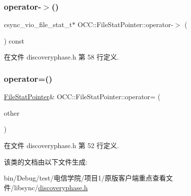 \subsubsection{\texorpdfstring{operator-\/$>$()}{operator->()}}
{\footnotesize\ttfamily csync\+\_\+vio\+\_\+file\+\_\+stat\+\_\+t$\ast$ O\+C\+C\+::\+File\+Stat\+Pointer\+::operator-\/$>$ (\begin{DoxyParamCaption}{ }\end{DoxyParamCaption}) const}



在文件 discoveryphase.\+h 第 58 行定义.

\mbox{\label{class_o_c_c_1_1_file_stat_pointer_a545ea796746e369b08c4810f6905cb23}} 
\subsubsection{\texorpdfstring{operator=()}{operator=()}}
{\footnotesize\ttfamily \hyperlink{class_o_c_c_1_1_file_stat_pointer}{File\+Stat\+Pointer}\& O\+C\+C\+::\+File\+Stat\+Pointer\+::operator= (\begin{DoxyParamCaption}\item[{const \hyperlink{class_o_c_c_1_1_file_stat_pointer}{File\+Stat\+Pointer} \&}]{other }\end{DoxyParamCaption})}



在文件 discoveryphase.\+h 第 52 行定义.



该类的文档由以下文件生成\+:\begin{DoxyCompactItemize}
\item 
bin/\+Debug/test/电信学院/项目1/原版客户端重点查看文件/libsync/\hyperlink{discoveryphase_8h}{discoveryphase.\+h}\end{DoxyCompactItemize}
